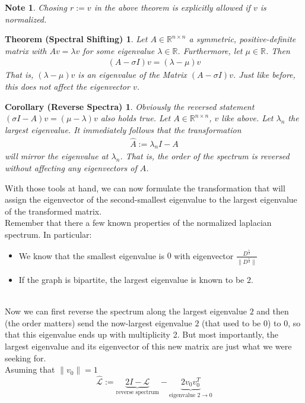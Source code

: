 \documentclass[10pt, a4paper, twocolumn]{article} %
\begin{document}
\newtheorem{Brauer Param Note}[]{Note}[section]
\begin{Brauer Param Note}
Chosing $r:=v$ in the above theorem is explicitly allowed if $v$ is normalized.
\end{Brauer Param Note}

\newtheorem{Spectral Shifting}[]{Theorem (Spectral Shifting)}[section]
\begin{Spectral Shifting}
	Let $A \in \mathbb{R}^{n \times n}$ a symmetric, positive-definite matrix with $Av=\lambda v$ for some eigenvalue $\lambda \in \mathbb{R}$.
	Furthermore, let $\mu \in \mathbb{R}$. Then
	\begin{align}
		(A - \sigma I)v = (\lambda - \mu)v
	\end{align}
That is, $(\lambda - \mu)v$ is an eigenvalue of the Matrix $(A - \sigma I)v$. Just like before, this does not affect the
eigenvector $v$.
\end{Spectral Shifting}

\newtheorem{Reversal}[]{Corollary (Reverse Spectra)}[section]
\begin{Reversal}
	Obviously the reversed statement $(\sigma I - A)v = (\mu - \lambda)v$ also holds true.
	Let $A \in \mathbb{R}^{n \times n}$, $v$ like above. Let $\lambda_n$ the largest eigenvalue.
	It immediately follows that the transformation
	\begin{align}
		\hat{A} := \lambda_n I - A
	\end{align}
	will mirror the eigenvalue at $\lambda_n$. That is, the order of the spectrum is reversed without affecting any eigenvectors of $A$.
\end{Reversal}
With those tools at hand, we can now formulate the transformation that will assign the eigenvector of the
second-smallest eigenvalue to the largest eigenvalue of the transformed matrix.
\\
Remember that there a few known properties of the normalized laplacian spectrum. In particular:
\begin{itemize}
	\item We know that the smallest eigenvalue is $0$ with eigenvector $\frac{D^\frac{1}{2}}{\lVert D^\frac{1}{2} \rVert}$ %
	\item If the graph is bipartite, the largest eigenvalue is known to be $2$.
\end{itemize}
\\
Now we can first reverse the spectrum along the largest eigenvalue $2$ and then (the order matters) send the
now-largest eigenvalue $2$ (that used to be $0$) to $0$, so that this eigenvalue ends up with multiplicity 2.
But most importantly, the largest eigenvalue and its eigenvector of this new matrix are just what we were seeking for.
\\
Asuming that $\lVert v_0 \lVert = 1$
\begin{equation}
		\hat{\mathcal{L}} := \underbrace{2I - \mathcal{L}}_{\text{reverse spectrum}} - \underbrace{2 v_0 v_0^T}_{\text{eigenvalue $2 \rightarrow 0$}}
\end{equation}
\end{document}
